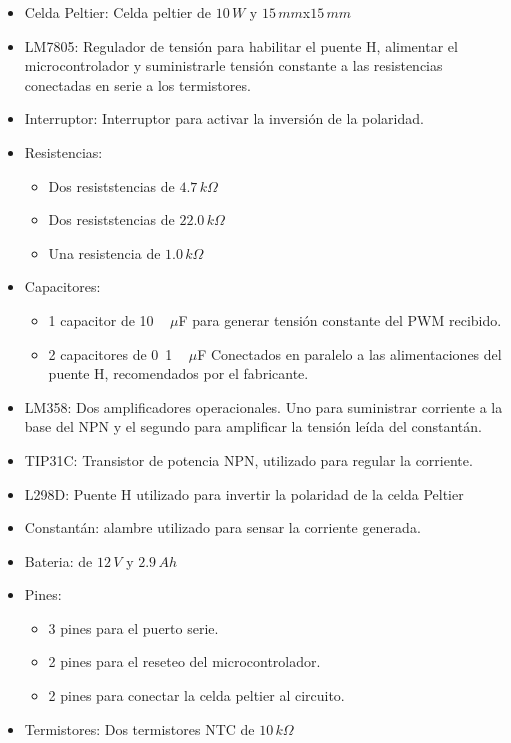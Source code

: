 \documentclass[10pt,spanish,a4paper,openany,notitlepage]{article}
\begin{document}
\begin{itemize}
\item{Celda Peltier:} Celda peltier de $10\, \unit{W}$ y $15\, \unit{mm}$x$15\,\unit{mm}$ 
\item{LM7805:} Regulador de tensión para habilitar el puente H, alimentar
el microcontrolador y suministrarle tensión constante a las resistencias conectadas
en serie a los termistores.
\item{Interruptor:} Interruptor para activar la inversión de la polaridad.
\item{Resistencias:}
	\begin{itemize}
	\item Dos resiststencias de $4.7\,\unit{k\Omega}$
	\item Dos resiststencias de $22.0\,\unit{k\Omega}$
	\item Una resistencia de $1.0\,\unit{k\Omega}$
	\end{itemize}
\item{Capacitores:} 
	\begin{itemize}
	\item 1 capacitor de \unit{10\, \unit{$\mu$F}} para generar
	tensión constante del PWM recibido.
	\item 2 capacitores de \unit{0.1\, \unit{$\mu$F}} Conectados en paralelo
	a las alimentaciones del puente H, recomendados por el fabricante. 
	\end{itemize}
\item{LM358:} Dos amplificadores operacionales. Uno para suministrar corriente
a la base del NPN y el segundo para amplificar la tensión leída del constantán. 
\item{TIP31C:} Transistor de potencia NPN, utilizado para regular la corriente.
\item{L298D:} Puente H utilizado para invertir la polaridad de la celda Peltier
\item{Constantán:} alambre utilizado para sensar la corriente generada.
\item{Bateria:} de $12\, \unit{V}$ y $2.9\, \unit{Ah}$
\item{Pines:}
	\begin{itemize}
	\item 3 pines para el puerto serie.
	\item 2 pines para el reseteo del microcontrolador.
	\item 2 pines para conectar la celda peltier al circuito.
	\end{itemize}
\item{Termistores:} Dos termistores NTC de $10\, \unit{k\Omega}$
\end{itemize}
\end{document}
